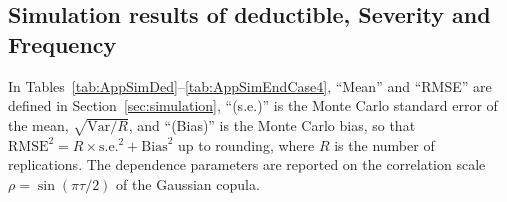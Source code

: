 \documentclass[11pt]{article}
\newcommand{\rev}[1]{{\color{blue}#1}}
\begin{document}
\FloatBarrier

\subsection*{Simulation results of deductible, Severity and Frequency}

\rev{In Tables~\ref{tab:AppSimDed}--\ref{tab:AppSimEndCase4}, ``Mean'' and ``RMSE'' are defined in Section~\ref{sec:simulation}, ``(s.e.)'' is the Monte Carlo standard error of the mean, $\sqrt{\text{Var}/R}$, and ``(Bias)'' is the Monte Carlo bias, so that $\text{RMSE}^2=R\times\text{s.e.}^2+\text{Bias}^2$ up to rounding, where $R$ is the number of replications. The dependence parameters are reported on the correlation scale $\rho=\sin(\pi\tau/2)$ of the Gaussian copula.}

\end{document}
